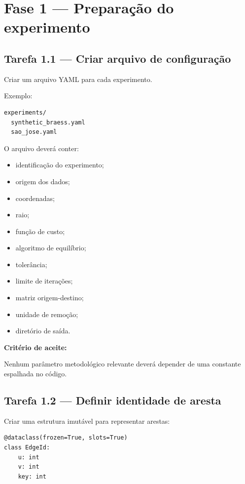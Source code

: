 \documentclass[12pt,a4paper]{article}
\begin{document}
\section{Fase 1 --- Preparação do experimento}

\subsection{Tarefa 1.1 --- Criar arquivo de configuração}

Criar um arquivo YAML para cada experimento.

Exemplo:

\begin{verbatim}
experiments/
  synthetic_braess.yaml
  sao_jose.yaml
\end{verbatim}

O arquivo deverá conter:

\begin{itemize}
    \item identificação do experimento;
    \item origem dos dados;
    \item coordenadas;
    \item raio;
    \item função de custo;
    \item algoritmo de equilíbrio;
    \item tolerância;
    \item limite de iterações;
    \item matriz origem-destino;
    \item unidade de remoção;
    \item diretório de saída.
\end{itemize}

\textbf{Critério de aceite:}

Nenhum parâmetro metodológico relevante deverá depender de uma constante
espalhada no código.

\subsection{Tarefa 1.2 --- Definir identidade de aresta}

Criar uma estrutura imutável para representar arestas:

\begin{verbatim}
@dataclass(frozen=True, slots=True)
class EdgeId:
    u: int
    v: int
    key: int
\end{verbatim}
\end{document}
